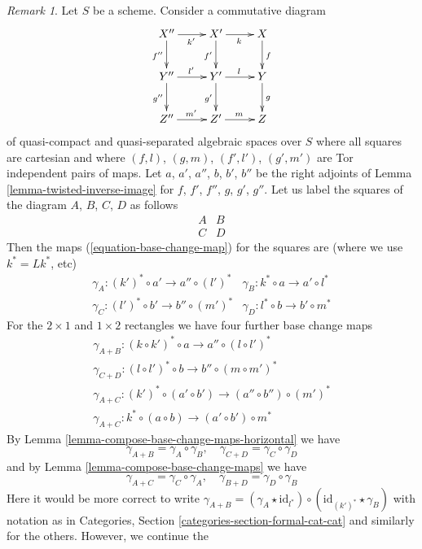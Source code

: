 \documentclass{stacks-project}
\theoremstyle{plain}
\theoremstyle{definition}
\theoremstyle{remark}
\newtheorem{remark}[subsection]{Remark}
\numberwithin{equation}{subsection}
\begin{document}
\begin{remark}
\label{remark-going-around}
Let $S$ be a scheme. Consider a commutative diagram
$$
\xymatrix{
X'' \ar[r]_{k'} \ar[d]_{f''} & X' \ar[r]_k \ar[d]_{f'} & X \ar[d]^f \\
Y'' \ar[r]^{l'} \ar[d]_{g''} & Y' \ar[r]^l \ar[d]_{g'} & Y \ar[d]^g \\
Z'' \ar[r]^{m'} & Z' \ar[r]^m & Z
}
$$
of quasi-compact and quasi-separated algebraic spaces over $S$ where
all squares are cartesian and where
$(f, l)$, $(g, m)$, $(f', l')$, $(g', m')$ are
Tor independent pairs of maps.
Let $a$, $a'$, $a''$, $b$, $b'$, $b''$ be the
right adjoints of Lemma \ref{lemma-twisted-inverse-image}
for $f$, $f'$, $f''$, $g$, $g'$, $g''$.
Let us label the squares of the diagram $A$, $B$, $C$, $D$
as follows
$$
\begin{matrix}
A & B \\
C & D
\end{matrix}
$$
Then the maps (\ref{equation-base-change-map})
for the squares are (where we use $k^* = Lk^*$, etc)
$$
\begin{matrix}
\gamma_A : (k')^* \circ a' \to a'' \circ (l')^* &
\gamma_B : k^* \circ a \to a' \circ l^* \\
\gamma_C : (l')^* \circ b' \to b'' \circ (m')^* &
\gamma_D : l^* \circ b \to b' \circ m^*
\end{matrix}
$$
For the $2 \times 1$ and $1 \times 2$ rectangles we have four further
base change maps
$$
\begin{matrix}
\gamma_{A + B} : (k \circ k')^* \circ a \to a'' \circ (l \circ l')^* \\
\gamma_{C + D} : (l \circ l')^* \circ b \to b'' \circ (m \circ m')^* \\
\gamma_{A + C} : (k')^* \circ (a' \circ b') \to (a'' \circ b'') \circ (m')^* \\
\gamma_{A + C} : k^* \circ (a \circ b) \to (a' \circ b') \circ m^*
\end{matrix}
$$
By Lemma \ref{lemma-compose-base-change-maps-horizontal} we have
$$
\gamma_{A + B} = \gamma_A \circ \gamma_B, \quad
\gamma_{C + D} = \gamma_C \circ \gamma_D
$$
and by Lemma \ref{lemma-compose-base-change-maps} we have
$$
\gamma_{A + C} = \gamma_C \circ \gamma_A, \quad
\gamma_{B + D} = \gamma_D \circ \gamma_B
$$
Here it would be more correct to write
$\gamma_{A + B} = (\gamma_A \star \text{id}_{l^*}) \circ
(\text{id}_{(k')^*} \star \gamma_B)$ with notation as in
Categories, Section \ref{categories-section-formal-cat-cat}
and similarly for the others. However, we continue the

\end{remark}
\end{document}

